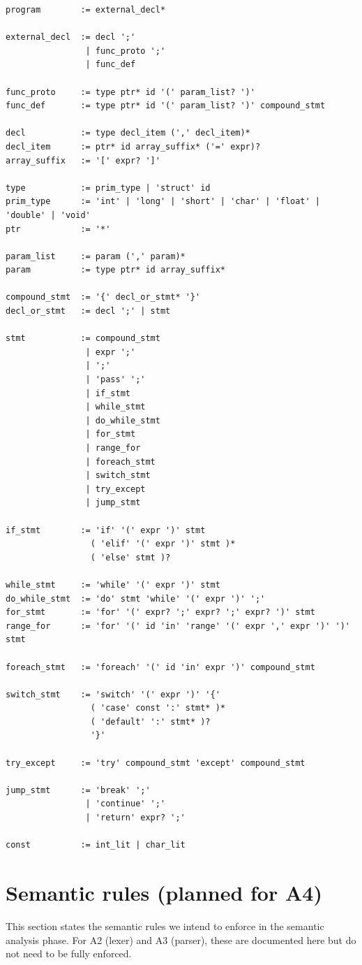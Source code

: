 \documentclass[11pt]{article}
\begin{document}
\begin{lstlisting}
program        := external_decl*

external_decl  := decl ';'
                | func_proto ';'
                | func_def

func_proto     := type ptr* id '(' param_list? ')'
func_def       := type ptr* id '(' param_list? ')' compound_stmt

decl           := type decl_item (',' decl_item)*
decl_item      := ptr* id array_suffix* ('=' expr)?
array_suffix   := '[' expr? ']'

type           := prim_type | 'struct' id
prim_type      := 'int' | 'long' | 'short' | 'char' | 'float' | 'double' | 'void'
ptr            := '*'

param_list     := param (',' param)*
param          := type ptr* id array_suffix*

compound_stmt  := '{' decl_or_stmt* '}'
decl_or_stmt   := decl ';' | stmt

stmt           := compound_stmt
                | expr ';'
                | ';'
                | 'pass' ';'
                | if_stmt
                | while_stmt
                | do_while_stmt
                | for_stmt
                | range_for
                | foreach_stmt
                | switch_stmt
                | try_except
                | jump_stmt

if_stmt        := 'if' '(' expr ')' stmt
				 ( 'elif' '(' expr ')' stmt )*
				 ( 'else' stmt )?

while_stmt     := 'while' '(' expr ')' stmt
do_while_stmt  := 'do' stmt 'while' '(' expr ')' ';'
for_stmt       := 'for' '(' expr? ';' expr? ';' expr? ')' stmt
range_for      := 'for' '(' id 'in' 'range' '(' expr ',' expr ')' ')' stmt

foreach_stmt   := 'foreach' '(' id 'in' expr ')' compound_stmt

switch_stmt    := 'switch' '(' expr ')' '{'
				 ( 'case' const ':' stmt* )*
				 ( 'default' ':' stmt* )?
				 '}'

try_except     := 'try' compound_stmt 'except' compound_stmt

jump_stmt      := 'break' ';'
                | 'continue' ';'
                | 'return' expr? ';'

const          := int_lit | char_lit
\end{lstlisting}

\section{Semantic rules (planned for A4)}
This section states the semantic rules we intend to enforce in the semantic analysis phase.
For A2 (lexer) and A3 (parser), these are documented here but do not need to be fully enforced.
\end{document}
